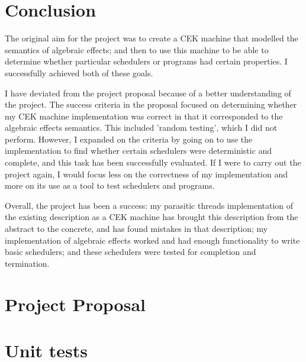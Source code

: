 \documentclass[12pt,a4paper,twoside,openright]{report}
\begin{document}
\chapter{Conclusion}

The original aim for the project was to create a CEK machine that modelled the semantics of algebraic effects; and then to use this machine to be able to determine whether particular schedulers or programs had certain properties. I successfully achieved both of these goals.

I have deviated from the project proposal because of a better understanding of the project. The success criteria in the proposal focused on determining whether my CEK machine implementation was correct in that it corresponded to the algebraic effects semantics. This included 'random testing', which I did not perform. However, I expanded on the criteria by going on to use the implementation to find whether certain schedulers were deterministic and complete, and this task has been successfully evaluated. If I were to carry out the project again, I would focus less on the correctness of my implementation and more on its use as a tool to test schedulers and programs.

Overall, the project has been a success: my parasitic threads implementation of the existing description as a CEK machine has brought this description from the abstract to the concrete, and has found mistakes in that description; my implementation of algebraic effects worked and had enough functionality to write basic schedulers; and these schedulers were tested for completion and termination.






\appendix

\chapter{Project Proposal}

\chapter{Unit tests}
\end{document}

